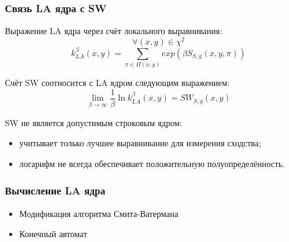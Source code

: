 \documentclass{beamer}
\begin{document}
\begin{frame}
\frametitle{Связь LA ядра с SW}
Выражение LA ядра через счёт локального выравнивания:
\begin{equation*}
    \forall (x, y) \in \chi^2
\end{equation*}
\begin{equation*}
    k_{LA}^{\beta}(x, y) = \sum_{\pi \in \Pi(x, y)}exp(\beta S_{S, g}(x, y, \pi))
\end{equation*}
\bigskip

Счёт SW соотносится с LA ядром следующим выражением:
\begin{equation*}
    \lim_{\beta\to\infty} \frac{1}{\beta} \ln k_{LA}^{\beta}(x, y)
    = SW_{S,g}(x, y)
\end{equation*}

SW не является допустимым строковым ядром:
\begin{itemize}
    \item учитывает только лучшее выравнивание для измерения сходства;
    \item логарифм не всегда обеспечивает положительную полуопределённость.
\end{itemize}
\end{frame}

\begin{frame}
\frametitle{Вычисление LA ядра}
\begin{itemize}
    \item Модификация алгоритма Смита-Ватермана
    \item Конечный автомат
        \begin{figure}[h]
        \end{figure}
\end{itemize}
\end{frame}
\end{document}

